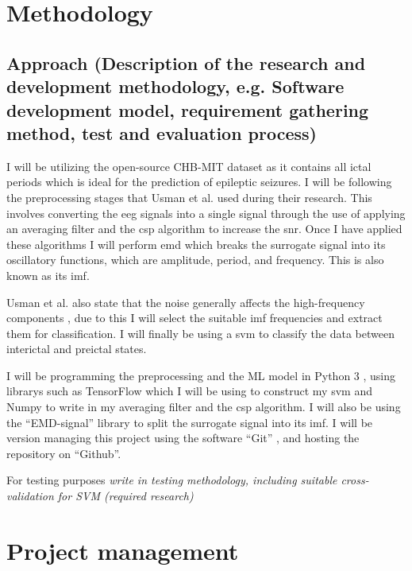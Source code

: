 \documentclass[12pt]{article}
\begin{document}
\section{Methodology}

\subsection{Approach (Description of the research and development methodology, e.g. Software
development model, requirement gathering method, test and evaluation process)}

I will be utilizing the open-source CHB-MIT dataset \cite{shoeb2009application} \cite{PhysioNet} as it contains all ictal periods which is ideal for the prediction of epileptic seizures. I will be following the preprocessing stages that Usman et al. used during their research. This involves converting the \acrshort{eeg} signals into a single signal through the use of applying an averaging filter and the \acrfull{csp} algorithm to increase the \acrshort{snr}. Once I have applied these algorithms I will perform \acrshort{emd} which breaks the surrogate signal into its oscillatory functions, which are amplitude, period, and frequency. This is also known as its \acrfull{imf}.

Usman et al. also state that the noise generally affects the high-frequency components \cite{usman2017epileptic}, due to this I will select the suitable \acrshort{imf} frequencies and extract them for classification. I will finally be using a \acrshort{svm} to classify the data between interictal and preictal states.

I will be programming the preprocessing and the ML model in Python 3 \cite{python3}, using librarys such as TensorFlow \cite{tensorflow2015-whitepaper} which I will be using to construct my \acrshort{svm} and Numpy \cite{harris2020array} to write in my averaging filter and the \acrshort{csp} algorithm. I will also be using the ``EMD-signal'' library \cite{pyemd} to split the surrogate signal into its \acrshort{imf}. I will be version managing this project using the software ``Git'' , and hosting the repository on ``Github''.

For testing purposes \textit{write in testing methodology, including suitable cross-validation for SVM (required research)}



\section{Project management}
\end{document}
